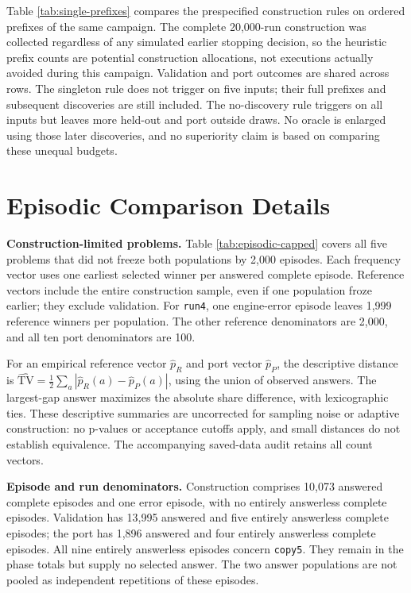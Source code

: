 \documentclass[10pt,letterpaper]{article}
\begin{document}


Table \ref{tab:single-prefixes} compares the prespecified construction rules on ordered
prefixes of the same campaign. The complete 20,000-run construction was collected
regardless of any simulated earlier stopping decision, so the heuristic prefix counts are
potential construction allocations, not executions actually avoided during this campaign.
Validation and port outcomes are shared across rows. The singleton rule does not trigger
on five inputs; their full prefixes and subsequent discoveries are still included. The
no-discovery rule triggers on all inputs but leaves more held-out and port outside draws.
No oracle is enlarged using those later discoveries, and no superiority claim is based on
comparing these unequal budgets.



\clearpage

\section{Episodic Comparison Details}\label{app:episodic-comparisons}

\textbf{Construction-limited problems.} Table \ref{tab:episodic-capped} covers all five
problems that did not freeze both populations by 2,000 episodes. Each frequency vector
uses one earliest selected winner per answered complete episode. Reference vectors include
the entire construction sample, even if one population froze earlier; they exclude
validation. For \texttt{run4}, one engine-error episode leaves 1,999 reference winners per
population. The other reference denominators are 2,000, and all ten port denominators are
100.

For an empirical reference vector \(\widehat p_R\) and port vector \(\widehat p_P\), the
descriptive distance is
\(\widehat{\mathrm{TV}}=\frac12\sum_a|\widehat p_R(a)-\widehat p_P(a)|\), using the union
of observed answers. The largest-gap answer maximizes the absolute share difference, with
lexicographic ties. These descriptive summaries are uncorrected for sampling noise or
adaptive construction: no p-values or acceptance cutoffs apply, and small distances do not
establish equivalence. The accompanying saved-data audit retains all count vectors.



\textbf{Episode and run denominators.} Construction comprises 10,073 answered complete
episodes and one error episode, with no entirely answerless complete episodes. Validation
has 13,995 answered and five entirely answerless complete episodes; the port has 1,896
answered and four entirely answerless complete episodes. All nine entirely answerless
episodes concern \texttt{copy5}. They remain in the phase totals but supply no selected
answer. The two answer populations are not pooled as independent repetitions of these
episodes.
\end{document}
